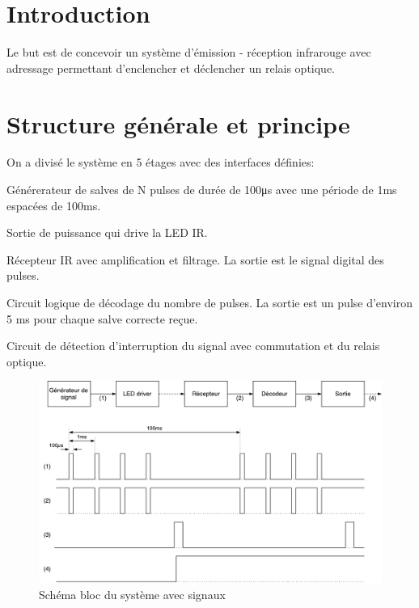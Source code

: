 \documentclass[french]{layout/Report}
\begin{document}


\section{Introduction}
Le but est de concevoir un système d'émission - réception infrarouge avec adressage
permettant d'enclencher et déclencher un relais optique.

\section{Structure générale et principe}

On a divisé le système en 5 étages avec des interfaces définies:

\begin{description}[leftmargin=!,labelwidth=4cm, labelindent=\parindent]
\item[Générateur de signal] Générerateur de salves de N pulses de durée de 100\si{\micro\second} avec une période de 1\si{\milli\second} espacées de 100\si{\milli\second}.
\item[LED driver] Sortie de puissance qui drive la LED IR.
\item[Récepteur] Récepteur IR avec amplification et filtrage. La sortie est le signal digital des pulses.
\item[Décodeur] Circuit logique de décodage du nombre de pulses. La sortie est un pulse d'environ 5 \si{\milli\second} pour chaque salve correcte reçue.
\item[Sortie] Circuit de détection d'interruption du signal avec commutation et du relais optique.
\end{description}

\begin{figure}[h]
\centering
\vspace{5mm}
\includegraphics[width=\textwidth]{fig/IRemote_schema_structure}
\caption{Schéma bloc du système avec signaux}
\label{fig:schema_bloc}
\vspace{5mm}
\end{figure}
\end{document}
